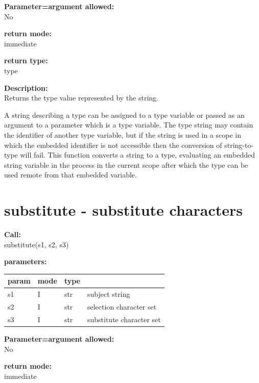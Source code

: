         {\bf Parameter=argument allowed:} \\
        No
        
        {\bf return mode:} \\
        immediate

        {\bf return type:} \\
        type
        
        {\bf Description:} \\
        Returns the type value represented by the string.
        
        A string describing a type can be assigned to a type variable or passed as
        an argument to a parameter which is a type variable. The type string
        may contain the identifier of another type variable, but if the string
        is used in a scope in which the embedded identifier is not
        accessible then the conversion of string-to-type will fail. This
        function converts a string to a type, evaluating an embedded
        string variable in the process in the current scope after which the type
        can be used remote from that embedded variable.




    \section{substitute - substitute characters}\label{sec:ifsubstitute}
        
        {\bf Call:} \\
        substitute(s1, s2, s3)
        
        {\bf parameters:} \\
        \begin{tabular}{| l | l | l | l |}
        \hline
        param  & mode & type & \\
        \hline \hline
        s1 & I & str & subject string           \\ \hline
        s2 & I & str & selection character set  \\ \hline
        s3 & I & str & substitute character set \\ \hline
        \end{tabular}
        
        {\bf Parameter=argument allowed:} \\
        No
        
        {\bf return mode:} \\
        immediate

